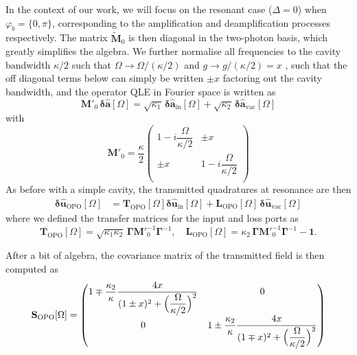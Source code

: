 In the context of our work, we will focus on the resonant case ($\Delta=0$) when $\varphi_b = \{0,\pi\}$, corresponding to the amplification and deamplification processes respectively. The matrix $\tilde{\mathbf{M}}_0$ is then diagonal in the two-photon basis, which greatly simplifies the algebra. We further normalise all frequencies to the cavity bandwidth $\kappa/2$ such that $\Omega \rightarrow \Omega/(\kappa/2)$ and $g \rightarrow g/(\kappa/2) = x$
, such that the off diagonal terms below can simply be written $\pm x$ factoring out the cavity bandwidth, and the operator QLE in Fourier space is written as 
\begin{equation}
     \mathbf{M'}_0 \,  \mathbf{\delta \hat{a}}[\Omega]  = \sqrt{\kappa_{\mathrm{1}}} \, \mathbf{\delta \hat{a}_{\mathrm{in}}}[\Omega]  + \sqrt{\kappa_2} \, \mathbf{\delta \hat{a}_{\mathrm{vac}}}[\Omega]  
\end{equation}
with 
\begin{equation}
  \mathbf{M'}_0 = \frac{\kappa}{2}\begin{pmatrix}
  1-i\dfrac{\Omega}{\kappa/2} & \pm x\\ 
  \pm x  & 1-i\dfrac{\Omega}{\kappa/2}\\ 
  \end{pmatrix} 
\end{equation}
As before with a simple cavity, the transmitted quadratures at resonance are then 
\begin{equation}
\begin{split}
  \mathbf{\delta \hat{u}_{\mathrm{OPO}}}[\Omega] & =  \mathbf{T}_{\mathrm{OPO}}[\Omega] \mathbf{\delta \hat{u}_{\mathrm{in}}}[\Omega] +  \mathbf{L}_{\mathrm{OPO}}[\Omega] \, \mathbf{\delta \hat{u}_{\mathrm{vac}}}[\Omega] 
\end{split}
\end{equation}
where we defined the transfer matrices for the input and loss ports as
\begin{equation}
  \mathbf{T}_{\mathrm{OPO}}[\Omega]=  \sqrt{\kappa_1 \kappa_2 } \,\mathbf{\Gamma}  \mathbf{M'}^{-1}_0 \mathbf{\Gamma}^{-1}, \quad \mathbf{L}_{\mathrm{OPO}}[\Omega]=  \kappa_2 \,\mathbf{\Gamma}  \mathbf{M'}^{-1}_0 \mathbf{\Gamma}^{-1}- \mathbf{1}.
\end{equation}

After a bit of algebra, the covariance matrix of the transmitted field is then computed as
\begin{equation}
      \mathbf{S}_{\rm OPO}[\Omega] =\begin{pmatrix}
        1 \mp \dfrac{\kappa_2}{\kappa} \dfrac{4x}{(1\pm x)^2+ \Big(\dfrac{\Omega}{\kappa/2}\Big)^2} & 0 \\[10pt]
        0 & 1 \pm \dfrac{\kappa_2}{\kappa} \dfrac{4x}{(1\mp x)^2+ \Big(\dfrac{\Omega}{\kappa/2}\Big)^2} 
      \end{pmatrix}
      \label{eq:II85}
\end{equation}




